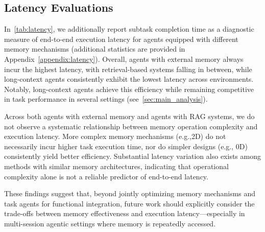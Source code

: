 




\subsection{Latency Evaluations}

In~\cref{tab:latency}, we additionally report subtask completion time as a diagnostic measure of end-to-end execution latency for agents equipped with different memory mechanisms (additional statistics are provided in Appendix~\ref{appendix:latency}). Overall, agents with external memory always incur the highest latency, with retrieval-based systems falling in between, while long-context agents consistently exhibit the lowest latency across environments. Notably, long-context agents achieve this efficiency while remaining competitive in task performance in several settings (see~\cref{sec:main_analysis}).

Across both agents with external memory and agents with RAG systems, we do not observe a systematic relationship between memory operation complexity and execution latency. More complex memory mechanisms (e.g.,2D) do not necessarily incur higher task execution time, nor do simpler designs (e.g., 0D) consistently yield better efficiency. Substantial latency variation also exists among methods with similar memory architectures, indicating that operational complexity alone is not a reliable predictor of end-to-end latency.

These findings suggest that, beyond jointly optimizing memory mechanisms and task agents for functional integration, future work should explicitly consider the trade-offs between memory effectiveness and execution latency—especially in multi-session agentic settings where memory is repeatedly accessed.



